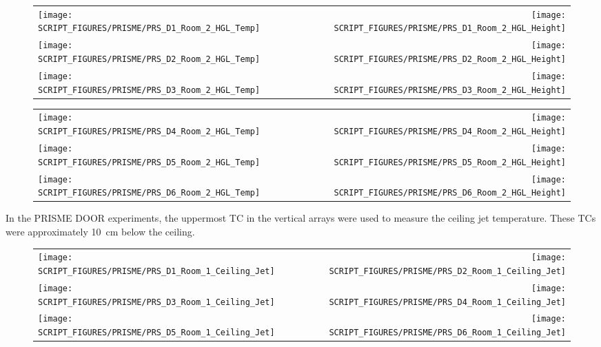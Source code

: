 \begin{figure}[p]
\begin{tabular*}{\textwidth}{l@{\extracolsep{\fill}}r}
\texttt{[image: SCRIPT\_FIGURES/PRISME/PRS\_D1\_Room\_2\_HGL\_Temp]} &
\texttt{[image: SCRIPT\_FIGURES/PRISME/PRS\_D1\_Room\_2\_HGL\_Height]} \\
\texttt{[image: SCRIPT\_FIGURES/PRISME/PRS\_D2\_Room\_2\_HGL\_Temp]} &
\texttt{[image: SCRIPT\_FIGURES/PRISME/PRS\_D2\_Room\_2\_HGL\_Height]} \\
\texttt{[image: SCRIPT\_FIGURES/PRISME/PRS\_D3\_Room\_2\_HGL\_Temp]} &
\texttt{[image: SCRIPT\_FIGURES/PRISME/PRS\_D3\_Room\_2\_HGL\_Height]}
\end{tabular*}
\label{PRISME_HGL_3}
\end{figure}

\begin{figure}[p]
\begin{tabular*}{\textwidth}{l@{\extracolsep{\fill}}r}
\texttt{[image: SCRIPT\_FIGURES/PRISME/PRS\_D4\_Room\_2\_HGL\_Temp]} &
\texttt{[image: SCRIPT\_FIGURES/PRISME/PRS\_D4\_Room\_2\_HGL\_Height]} \\
\texttt{[image: SCRIPT\_FIGURES/PRISME/PRS\_D5\_Room\_2\_HGL\_Temp]} &
\texttt{[image: SCRIPT\_FIGURES/PRISME/PRS\_D5\_Room\_2\_HGL\_Height]} \\
\texttt{[image: SCRIPT\_FIGURES/PRISME/PRS\_D6\_Room\_2\_HGL\_Temp]} &
\texttt{[image: SCRIPT\_FIGURES/PRISME/PRS\_D6\_Room\_2\_HGL\_Height]}
\end{tabular*}
\label{PRISME_HGL_4}
\end{figure}

\clearpage

In the PRISME DOOR experiments, the uppermost TC in the vertical arrays were used to measure the ceiling jet temperature. These TCs were approximately 10~cm below the ceiling.

\begin{figure}[!ht]
\begin{tabular*}{\textwidth}{l@{\extracolsep{\fill}}r}
\texttt{[image: SCRIPT\_FIGURES/PRISME/PRS\_D1\_Room\_1\_Ceiling\_Jet]} &
\texttt{[image: SCRIPT\_FIGURES/PRISME/PRS\_D2\_Room\_1\_Ceiling\_Jet]} \\
\texttt{[image: SCRIPT\_FIGURES/PRISME/PRS\_D3\_Room\_1\_Ceiling\_Jet]} &
\texttt{[image: SCRIPT\_FIGURES/PRISME/PRS\_D4\_Room\_1\_Ceiling\_Jet]} \\
\texttt{[image: SCRIPT\_FIGURES/PRISME/PRS\_D5\_Room\_1\_Ceiling\_Jet]} &
\texttt{[image: SCRIPT\_FIGURES/PRISME/PRS\_D6\_Room\_1\_Ceiling\_Jet]}
\end{tabular*}
\label{PRISME_Ceiling_Jet_Room_1}
\end{figure}


